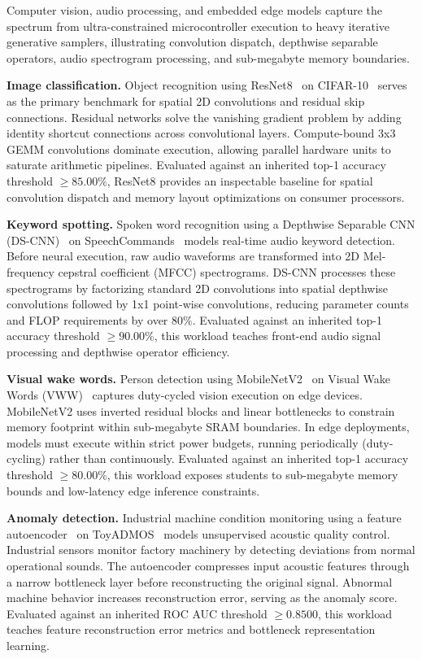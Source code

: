 \documentclass[10pt,twocolumn]{article}
\begin{document}
Computer vision, audio processing, and embedded edge models capture the spectrum from ultra-constrained microcontroller execution to heavy iterative generative samplers, illustrating convolution dispatch, depthwise separable operators, audio spectrogram processing, and sub-megabyte memory boundaries.

\textbf{Image classification.} Object recognition using ResNet8~\citep{he2016resnet} on CIFAR-10~\citep{krizhevsky2009cifar} serves as the primary benchmark for spatial 2D convolutions and residual skip connections. Residual networks solve the vanishing gradient problem by adding identity shortcut connections across convolutional layers. Compute-bound 3x3 GEMM convolutions dominate execution, allowing parallel hardware units to saturate arithmetic pipelines. Evaluated against an inherited top-1 accuracy threshold $\ge 85.00\%$, ResNet8 provides an inspectable baseline for spatial convolution dispatch and memory layout optimizations on consumer processors.

\textbf{Keyword spotting.} Spoken word recognition using a Depthwise Separable CNN (DS-CNN)~\citep{zhang2017dscnn} on SpeechCommands~\citep{warden2018speech} models real-time audio keyword detection. Before neural execution, raw audio waveforms are transformed into 2D Mel-frequency cepstral coefficient (MFCC) spectrograms. DS-CNN processes these spectrograms by factorizing standard 2D convolutions into spatial depthwise convolutions followed by 1x1 point-wise convolutions, reducing parameter counts and FLOP requirements by over $80\%$. Evaluated against an inherited top-1 accuracy threshold $\ge 90.00\%$, this workload teaches front-end audio signal processing and depthwise operator efficiency.

\textbf{Visual wake words.} Person detection using MobileNetV2~\citep{sandler2018} on Visual Wake Words (VWW)~\citep{chowdhery2019vww} captures duty-cycled vision execution on edge devices. MobileNetV2 uses inverted residual blocks and linear bottlenecks to constrain memory footprint within sub-megabyte SRAM boundaries. In edge deployments, models must execute within strict power budgets, running periodically (duty-cycling) rather than continuously. Evaluated against an inherited top-1 accuracy threshold $\ge 80.00\%$, this workload exposes students to sub-megabyte memory bounds and low-latency edge inference constraints.

\textbf{Anomaly detection.} Industrial machine condition monitoring using a feature autoencoder~\citep{sakurada2014autoencoder} on ToyADMOS~\citep{koizumi2019toyadmos} models unsupervised acoustic quality control. Industrial sensors monitor factory machinery by detecting deviations from normal operational sounds. The autoencoder compresses input acoustic features through a narrow bottleneck layer before reconstructing the original signal. Abnormal machine behavior increases reconstruction error, serving as the anomaly score. Evaluated against an inherited ROC AUC threshold $\ge 0.8500$, this workload teaches feature reconstruction error metrics and bottleneck representation learning.
\end{document}
